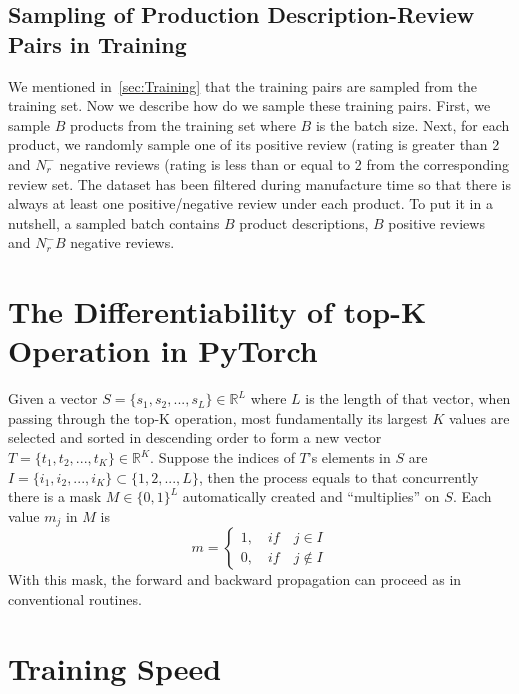 \subsection{Sampling of Production Description-Review Pairs in Training}
We mentioned in~\cref{sec:Training} that the training pairs are sampled from the training set.
Now we describe how do we sample these training pairs.
First, we sample $B$ products from the training set where $B$ is the batch size.
Next, for each product, we randomly sample one of its positive review (rating is greater than 2 and $N_r^{-}$ negative reviews (rating is less than or equal to 2 from the corresponding review set.
The dataset has been filtered during manufacture time so that there is always at least one positive/negative review under each product.
To put it in a nutshell, a sampled batch contains $B$ product descriptions, $B$ positive reviews and $N_r^{-}B$ negative reviews.

\section{The Differentiability of top-K Operation in PyTorch}
Given a vector $S = \{s_1, s_2, ..., s_L\} \in \mathbb{R}^L$ where $L$ is the length of that vector, when passing through the top-K operation, most fundamentally its largest $K$ values are selected and sorted in descending order to form a new vector $T = \{t_1, t_2, ..., t_K\} \in \mathbb{R}^K$. 
Suppose the indices of $T$'s elements in $S$ are $I= \{i_1, i_2, ..., i_K\} \subset \{1, 2, ..., L\}$, then the process equals to that concurrently there is a mask $M \in \{0,1\}^L $ automatically created and ``multiplies'' on $S$. 
Each value $m_j$ in $M$ is
\begin{equation*}
    m = 
    \begin{cases}
        1, \quad if \quad j \in I \\
        0, \quad if \quad j \notin I
    \end{cases}
\end{equation*}
With this mask, the forward and backward propagation can proceed as in conventional routines.

\section{Training Speed}
